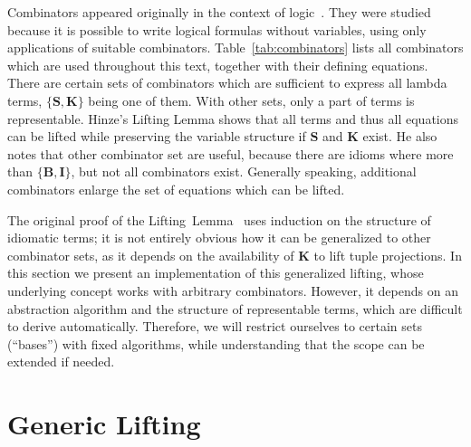 Combinators appeared originally in the context of logic~\cite{curry68}.
They were studied because it is possible to write logical formulas without
variables, using only applications of suitable combinators.
Table~\ref{tab:combinators} lists all combinators which are used throughout
this text, together with their defining equations.
There are certain sets of combinators which are sufficient to express all
lambda terms, $\{\mathbf{S,K}\}$ being one of them.
With other sets, only a part of terms is representable.
Hinze's Lifting Lemma shows that all terms and thus all equations can be
lifted while preserving the variable structure if $\mathbf{S}$ and $\mathbf{K}$
exist.
He also notes that other combinator set are useful, because there are idioms
where more than $\{\mathbf{B,I}\}$, but not all combinators exist.
Generally speaking, additional combinators enlarge the set of equations which
can be lifted.

The original proof of the Lifting~Lemma~\cite[11--14]{hinze10} uses induction
on the structure of idiomatic terms; it is not entirely obvious how it can
be generalized to other combinator sets, as it depends on the availability
of $\mathbf{K}$ to lift tuple projections.
In this section we present an implementation of this generalized lifting,
whose underlying concept works with arbitrary combinators.
However, it depends on an abstraction algorithm and the structure of
representable terms, which are difficult to derive automatically.
Therefore, we will restrict ourselves to certain sets (``bases'') with
fixed algorithms, while understanding that the scope can be extended 
if needed.

\section{Generic Lifting}\label{subsec:generic-lifting}

